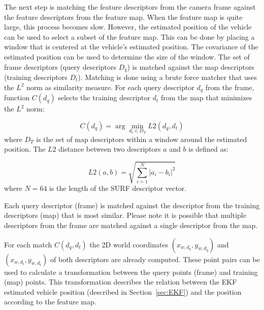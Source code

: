 
The next step is matching the feature descriptors from the camera frame against the feature descriptors from the feature map.
When the feature map is quite large, this process becomes slow.
However, the estimated position of the vehicle can be used to select a subset of the feature map.
This can be done by placing a window that is centered at the vehicle's estimated position.
The covariance of the estimated position can be used to determine the size of the window.
The set of frame descriptors (query descriptors $D_q$) is matched against the map descriptors (training descriptors $D_t$).
Matching is done using a brute force matcher that uses the $L^2$ norm as similarity measure.
For each query descriptor $d_q$ from the frame, function $C(d_q)$ selects the training descriptor $d_t$ from the map that minimizes the $L^2$ norm:


\begin{equation}
C(d_q) = \arg\min_{d_t \in D_T} L2(d_q, d_t)
\end{equation}
where $D_T$ is the set of map descriptors within a window around the estimated position.
The $L2$ distance between two descriptors $a$ and $b$ is defined as:

\begin{equation}
L2(a,b) =\sqrt { \sum_{i=1}^{N} \left| a_i - b_i \right| ^2 }
\end{equation}
where $N = 64$ is the length of the SURF descriptor vector.

Each query descriptor (frame) is matched against the descriptor from the training descriptors (map) that is most similar.
Please note it is possible that multiple descriptors from the frame are matched against a single descriptor from the map.

For each match $C(d_q, d_t)$ the 2D world coordinates $(x_{w, d_q}, y_{w, d_q})$ and $(x_{w, d_t}, y_{w, d_t})$ of both descriptors are already computed.
These point pairs can be used to calculate a transformation between the query points (frame) and training (map) points.
This transformation describes the relation between the EKF estimated vehicle position (described in Section~\ref{sec:EKF}) and the position according to the feature map.

